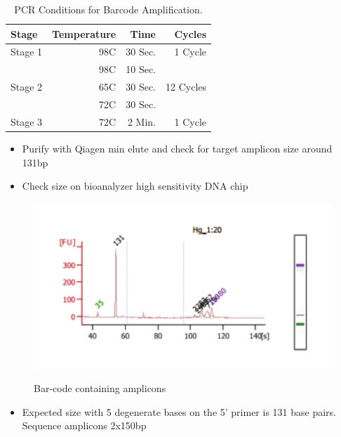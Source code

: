 \documentclass[a4paper]{article}
\begin{document}
        \FloatBarrier
            \begin{table}[H]
				\centering
				\begin{tabular}{l|r|r|r}
					Stage 	& 	Temperature	&	Time	&	Cycles		\\\hline
					Stage 1	&	98C			&	30 Sec.	&	1 Cycle		\\\hline
							&	98C			&	10 Sec.	&				\\
                    Stage 2	&	65C			&	30 Sec.	&	12 Cycles	\\
                    		&	72C			&	30 Sec.	&				\\\hline
                    Stage 3	&	72C			&	2 Min.	&	1 Cycle		\\
				\end{tabular}
           		\caption{\label{BarCodePCR}PCR Conditions for Barcode Amplification.}
           \end{table}
           
        \begin{itemize}
     		
            \item Purify with Qiagen min elute and check for target amplicon size around 131bp
            
            \item Check size on bioanalyzer high sensitivity DNA chip
            
        \end{itemize}
        
        \begin{figure}[H]
			\centering
			\includegraphics[width=1\textwidth]{BarcodeSeqTrace.pdf}
			\label{fig:BarcodeSize}
			\caption{Bar-code containing amplicons}
        \end{figure}
        
               
        \begin{itemize}
            
            \item Expected size with 5 degenerate bases on the 5' primer is 131 base pairs. Sequence amplicons 2x150bp
 
		\end{itemize}
\end{document}
